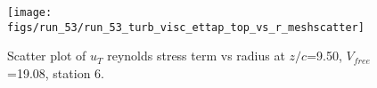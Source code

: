 \begin{figure}[H]
\centering
\texttt{[image: figs/run\_53/run\_53\_turb\_visc\_ettap\_top\_vs\_r\_meshscatter]}
\caption{Scatter plot of $
u_T$ reynolds stress term vs radius at $z/c$=9.50, $V_{free}$=19.08, station 6.}
\end{figure}


